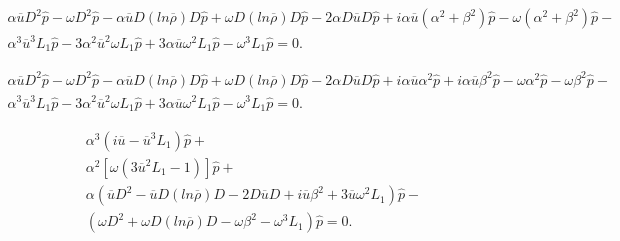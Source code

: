 \begin{equation*} 
\begin{split}
\alpha \overline{u}
D^2\hat{p}
-
\omega 
D^2\hat{p}
-
\alpha \overline{u}
D (ln\overline{\rho})
D\hat{p}
+
\omega
D (ln\overline{\rho})
D\hat{p}
-
2
\alpha 
D\overline{u}
D\hat{p}
+
i
\alpha \overline{u}
(\alpha^2+\beta^2)
\hat{p}
-\omega
(\alpha^2+\beta^2)
\hat{p}
-
\\
\alpha^3\overline{u}^3
L_1
\hat{p}
-
3\alpha^2\overline{u}^2\omega
L_1
\hat{p}
+
3\alpha\overline{u}\omega^2
L_1
\hat{p}
-
\omega^3
L_1
\hat{p}
=
0
.
\end{split}
\end{equation*} 

\begin{equation*} 
\begin{split}
\alpha \overline{u}
D^2\hat{p}
-
\omega 
D^2\hat{p}
-
\alpha \overline{u}
D (ln\overline{\rho})
D\hat{p}
+
\omega
D (ln\overline{\rho})
D\hat{p}
-
2
\alpha 
D\overline{u}
D\hat{p}
+
i
\alpha \overline{u}
\alpha^2
\hat{p}
+
i
\alpha \overline{u}
\beta^2
\hat{p}
-
\omega
\alpha^2
\hat{p}
-
\omega
\beta^2
\hat{p}
-
\\
\alpha^3\overline{u}^3
L_1
\hat{p}
-
3\alpha^2\overline{u}^2\omega
L_1
\hat{p}
+
3\alpha\overline{u}\omega^2
L_1
\hat{p}
-
\omega^3
L_1
\hat{p}
=
0
.
\end{split}
\end{equation*} 

\begin{equation*} 
\begin{split}
\alpha^3
\left(
    i
    \overline{u}
    -
    \overline{u}^3
    L_1
\right) \hat{p} 
+
 \\ \alpha^2 \left[ \omega
    \left(
    3
    \overline{u}^2
    L_1
    -
    1
    \right)
\right]
\hat{p}
+
\\
\alpha 
\left(
    \overline{u}
    D^2
    -
     \overline{u}
    D (ln\overline{\rho})
    D
    -
    2
    D\overline{u}
    D
    +
    i
    \overline{u}
    \beta^2
    +
    3
    \overline{u}\omega^2
    L_1
\right)
\hat{p}
-
\\
\left(
\omega 
D^2
+
\omega
D (ln\overline{\rho})
D
-
\omega
\beta^2
-
\omega^3
L_1
\right)
\hat{p}
=
0
.
\end{split}
\end{equation*} 

